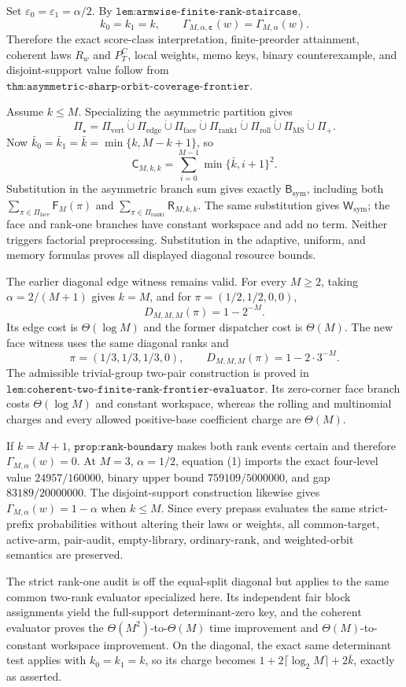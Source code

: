 Set
\(\varepsilon_0=\varepsilon_1=\alpha/2\). By
\(\texttt{lem:armwise-finite-rank-staircase}\),
\[
k_0=k_1=k,\qquad
\Gamma_{M,\alpha,\boldsymbol\varepsilon}(w)
=\Gamma_{M,\alpha}(w).
\tag{1}
\]
Therefore the exact score-class interpretation, finite-preorder attainment, coherent laws \(R_w\) and \(P_T^C\), local weights, memo keys, binary counterexample, and disjoint-support value follow from
\(\texttt{thm:asymmetric-sharp-orbit-coverage-frontier}\).

Assume \(k\le M\). Specializing the asymmetric partition gives
\[
\Pi_\star=\Pi_{\mathrm{vert}}\mathbin{\dot\cup}
\Pi_{\mathrm{edge}}\mathbin{\dot\cup}
\Pi_{\mathrm{face}}\mathbin{\dot\cup}
\Pi_{\mathrm{rank1}}\mathbin{\dot\cup}
\Pi_{\mathrm{roll}}\mathbin{\dot\cup}
\Pi_{\mathrm{MS}}\mathbin{\dot\cup}\Pi_+.
\tag{2}
\]
Now \(\bar k_0=\bar k_1=\bar k=\min\{k,M-k+1\}\), so
\[
\mathsf C_{M,k,k}
=\sum_{i=0}^{M-1}\min\{\bar k,i+1\}^2.
\]
Substitution in the asymmetric branch sum gives exactly
\(\mathsf B_{\mathrm{sym}}\), including both \(\sum_{\pi\in\Pi_{\mathrm{face}}}\mathsf F_M(\pi)\) and \(\sum_{\pi\in\Pi_{\mathrm{rank1}}}\mathsf R_{M,k,k}\).
The same substitution gives \(\mathsf W_{\mathrm{sym}}\); the face and rank-one branches have constant workspace and add no term. Neither triggers factorial preprocessing. Substitution in the adaptive, uniform, and memory formulas proves all displayed diagonal resource bounds.

The earlier diagonal edge witness remains valid. For every \(M\ge2\), taking
\(\alpha=2/(M+1)\) gives \(k=M\), and for
\(\pi=(1/2,1/2,0,0)\),
\[
D_{M,M,M}(\pi)=1-2^{-M}.
\]
Its edge cost is \(\Theta(\log M)\) and the former dispatcher cost is
\(\Theta(M)\). The new face witness uses the same diagonal ranks and
\[
\pi=(1/3,1/3,1/3,0),\qquad
D_{M,M,M}(\pi)=1-2\cdot3^{-M}.
\]
The admissible trivial-group two-pair construction is proved in
\(\texttt{lem:coherent-two-finite-rank-frontier-evaluator}\). Its zero-corner face branch costs \(\Theta(\log M)\) and constant workspace, whereas the rolling and multinomial charges and every allowed positive-base coefficient charge are \(\Theta(M)\).

If \(k=M+1\), \(\texttt{prop:rank-boundary}\) makes both rank events certain and therefore \(\Gamma_{M,\alpha}(w)=0\). At
\(M=3\), \(\alpha=1/2\), equation (1) imports the exact four-level value
\(24957/160000\), binary upper bound \(759109/5000000\), and gap
\(83189/20000000\). The disjoint-support construction likewise gives
\(\Gamma_{M,\alpha}(w)=1-\alpha\) when \(k\le M\). Since every prepass evaluates the same strict-prefix probabilities without altering their laws or weights, all common-target, active-arm, pair-audit, empty-library, ordinary-rank, and weighted-orbit semantics are preserved.

The strict rank-one audit is off the equal-split diagonal but applies to the same common two-rank evaluator specialized here. Its independent fair block assignments yield the full-support determinant-zero key, and the coherent evaluator proves the \(\Theta(M^2)\)-to-\(\Theta(M)\) time improvement and \(\Theta(M)\)-to-constant workspace improvement. On the diagonal, the exact same determinant test applies with \(k_0=k_1=k\), so its charge becomes \(1+2\lceil\log_2M\rceil+2\bar k\), exactly as asserted.